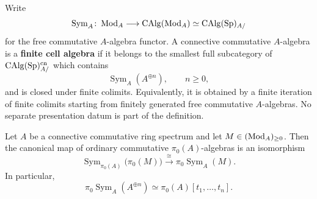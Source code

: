\begin{definition}
\label{def:finite-cell-spectral-algebra}
Write
\[
    \operatorname{Sym}_A
    \colon
    \operatorname{Mod}_A
    \longrightarrow
    \operatorname{CAlg}(\operatorname{Mod}_A)
    \simeq
    \operatorname{CAlg}(\operatorname{Sp})_{A/}
\]
for the free commutative \(A\)-algebra functor. A connective commutative
\(A\)-algebra is a \textbf{finite cell algebra} if it belongs to the smallest
full subcategory of \(\operatorname{CAlg}(\operatorname{Sp})^{\mathrm{cn}}_{A/}\) which contains
\[
    \operatorname{Sym}_A(A^{\oplus n}),
    \qquad n\geq0,
\]
and is closed under finite colimits. Equivalently, it is obtained by a finite
iteration of finite colimits starting from finitely generated free
commutative \(A\)-algebras. No separate presentation datum is part of the
definition.
\end{definition}

\begin{proposition}
\label{prop:pi-zero-relative-free-algebra}
Let \(A\) be a connective commutative ring spectrum and let
\(M\in(\operatorname{Mod}_A)_{\geq0}\). Then the canonical map of ordinary commutative
\(\pi_0(A)\)-algebras is an isomorphism
\[
    \operatorname{Sym}_{\pi_0(A)}\bigl(\pi_0(M)\bigr)
    \xrightarrow{\ \cong\ }
    \pi_0\operatorname{Sym}_A(M).
\]
In particular,
\[
    \pi_0\operatorname{Sym}_A(A^{\oplus n})
    \simeq
    \pi_0(A)[t_1,\ldots,t_n].
\]
\end{proposition}

